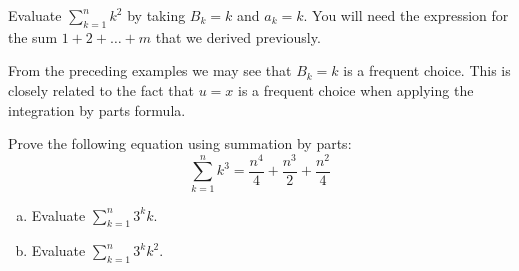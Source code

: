 \begin{exercise}{}
Evaluate $\sum_{k=1}^{n}k^{2}$ by taking $B_k=k$ and $a_k = k$. You will need the expression for the sum $1 + 2 + \ldots + m$ that we derived previously.
\end{exercise}

From the preceding examples we may see that $B_k = k$ is a frequent choice. This is closely related to the fact that $u=x$ is a frequent choice when applying  the integration by parts formula.


\begin{exercise}{}
Prove the following equation using summation by parts:
\[ \sum_{k=1}^n k^3 = \frac{n^4}{4} + \frac{n^3}{2} + \frac{n^2}{4} \]
\end{exercise}

\begin{exercise}{}
\begin{enumerate}[(a)]
\item
 Evaluate $\sum_{k=1}^{n}3^{k}k$.
\item
 Evaluate $\sum_{k=1}^{n}3^{k}k^2$.
\end{enumerate}
\end{exercise}


